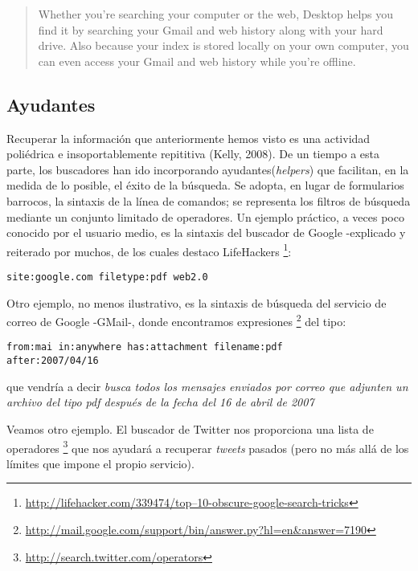 \documentclass[12pt, a4paper,twoside]{book}
\begin{document}
\begin{quote}
Whether you're searching your computer or the web, Desktop helps
you find it by searching your Gmail and web history along with your
hard drive. Also because your index is stored locally on your own
computer, you can even access your Gmail and web history while
you're offline.

\end{quote}
\subsection{Ayudantes}

Recuperar la información que anteriormente hemos visto es una
actividad poliédrica e insoportablemente repititiva (Kelly, 2008).
De un tiempo a esta parte, los buscadores han ido incorporando
ayudantes(\emph{helpers}) que facilitan, en la medida de lo
posible, el éxito de la búsqueda. Se adopta, en lugar de
formularios barrocos, la sintaxis de la línea de comandos; se
representa los filtros de búsqueda mediante un conjunto limitado de
operadores. Un ejemplo práctico, a veces poco conocido por el
usuario medio, es la sintaxis del buscador de Google -explicado y
reiterado por muchos, de los cuales destaco LifeHackers%
\footnote{\href{http://lifehacker.com/339474/top-10-obscure-google-search-tricks}{http://lifehacker.com/339474/top--10-obscure-google-search-tricks}}:

\begin{verbatim}
site:google.com filetype:pdf web2.0
\end{verbatim}
Otro ejemplo, no menos ilustrativo, es la sintaxis de búsqueda del
servicio de correo de Google -GMail-, donde encontramos
expresiones%
\footnote{\href{http://mail.google.com/support/bin/answer.py?hl=en&answer=7190}{http://mail.google.com/support/bin/answer.py?hl=en\&answer=7190}}
del tipo:

\begin{verbatim}
from:mai in:anywhere has:attachment filename:pdf
after:2007/04/16 
\end{verbatim}
que vendría a decir
\emph{busca todos los mensajes enviados por correo que adjunten un archivo del tipo pdf después de la fecha del 16 de abril de 2007}

Veamos otro ejemplo. El buscador de Twitter nos proporciona una
lista de operadores%
\footnote{\href{http://search.twitter.com/operators}{http://search.twitter.com/operators}}
que nos ayudará a recuperar \emph{tweets} pasados (pero no más allá
de los límites que impone el propio servicio).
\end{document}
